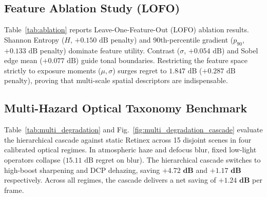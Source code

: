 \documentclass[journal]{IEEEtran}
\begin{document}
\subsection{Feature Ablation Study (LOFO)}
Table~\ref{tab:ablation} reports Leave-One-Feature-Out (LOFO) ablation results. Shannon Entropy ($H$, $+0.150\text{ dB}$ penalty) and 90th-percentile gradient ($p_{90}$, $+0.133\text{ dB}$ penalty) dominate feature utility. Contrast ($\sigma$, $+0.054\text{ dB}$) and Sobel edge mean ($+0.077\text{ dB}$) guide tonal boundaries. Restricting the feature space strictly to exposure moments ($\mu, \sigma$) surges regret to $1.847\text{ dB}$ ($+0.287\text{ dB}$ penalty), proving that multi-scale spatial descriptors are indispensable.



\subsection{Multi-Hazard Optical Taxonomy Benchmark}
Table~\ref{tab:multi_degradation} and Fig.~\ref{fig:multi_degradation_cascade} evaluate the hierarchical cascade against static Retinex across 15 disjoint scenes in four calibrated optical regimes. In atmospheric haze and defocus blur, fixed low-light operators collapse ($15.11\text{ dB}$ regret on blur). The hierarchical cascade switches to high-boost sharpening and DCP dehazing, saving $\mathbf{+4.72\text{ dB}}$ and $\mathbf{+1.17\text{ dB}}$ respectively. Across all regimes, the cascade delivers a net saving of $\mathbf{+1.24\text{ dB}}$ per frame.

\begin{table}[!t]
\caption{Multi-Degradation Optical Taxonomy Benchmark across 4 Regimes on 15 Disjoint Scenes.}
\label{tab:multi_degradation}
\centering
{}
\end{table}
\end{document}
